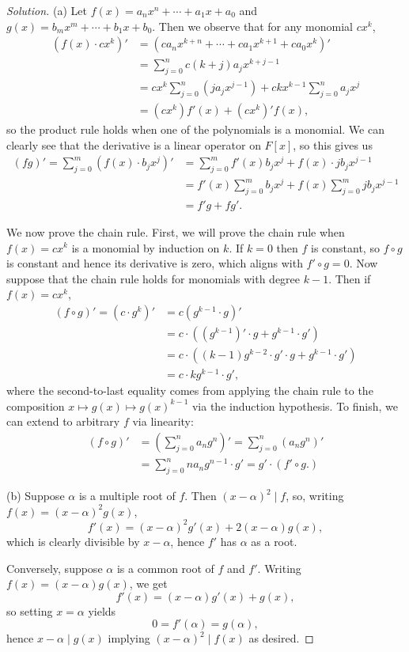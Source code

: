 \documentclass[10pt]{scrartcl}
\newenvironment{soln}{\begin{proof}[Solution]}{\end{proof}}
\begin{document}
\begin{soln}
	(a) Let $f(x) = a_nx^n + \cdots + a_1x+a_0$ and
	$g(x) = b_mx^m + \cdots + b_1x + b_0$.
	Then we observe that for any monomial $cx^k$,
	\begin{align*}
		(f(x)\cdot cx^k)' &=
		(ca_nx^{k+n} + \cdots + ca_1x^{k+1} + ca_0x^k)'\\
		&= \sum_{j=0}^n c(k+j)a_j x^{k+j-1}\\
		&= cx^k\sum_{j=0}^n(ja_j x^{j-1}) +
		ckx^{k-1} \sum_{j=0}^n a_jx^j\\
		&= (cx^k)f'(x) + (cx^k)' f(x),
	\end{align*}
	so the product rule holds when one of the polynomials is a monomial.
	We can clearly see that the derivative is a linear operator on $F[x]$,
	so this gives us
	\begin{align*}
		(fg)' = \sum_{j=0}^m (f(x)\cdot b_jx^j)'
		&= \sum_{j=0}^m f'(x)b_jx^j + f(x)\cdot jb_jx^{j-1}\\
		&= f'(x)\sum_{j=0}^m b_jx^j + f(x)\sum_{j=0}^m jb_jx^{j-1}\\
		&= f'g + fg'.
	\end{align*}

	We now prove the chain rule. First, we will prove the chain rule
	when $f(x) = cx^k$ is a monomial by induction on $k$.
	If $k = 0$ then $f$ is constant, so $f\circ g$ is constant
	and hence its derivative is zero, which aligns with $f'\circ g = 0$.
	Now suppose that the chain rule holds for monomials with degree $k-1$.
	Then if $f(x) = cx^k$,
	\begin{align*}
		(f\circ g)' = (c\cdot g^k)'
		&= c(g^{k-1}\cdot g)'\\
		&= c\cdot ((g^{k-1})'\cdot g + g^{k-1}\cdot g')\\
		&= c\cdot ((k-1)g^{k-2}\cdot g'\cdot g + g^{k-1}\cdot g')\\
		&= c\cdot kg^{k-1}\cdot g',
	\end{align*}
	where the second-to-last equality comes from applying
	the chain rule to the composition $x\mapsto g(x)\mapsto g(x)^{k-1}$
	via the induction hypothesis. To finish, we can extend to arbitrary $f$
	via linearity:
	\begin{align*}
		(f\circ g)' &= \left(\sum_{j=0}^n a_n g^n\right)'
		= \sum_{j=0}^n (a_n g^n)'\\
		&= \sum_{j=0}^n na_n g^{n-1}\cdot g' = g'\cdot (f'\circ g.)
	\end{align*}

	(b) Suppose $\alpha$ is a multiple root of $f$.
	Then $(x-\alpha)^2\mid f$, so, writing $f(x) = (x-\alpha)^2 g(x)$,
	\[f'(x) = (x-\alpha)^2 g'(x) + 2(x-\alpha)g(x),\]
	which is clearly divisible by $x-\alpha$, hence $f'$ has $\alpha$ as a root.
	
	Conversely, suppose $\alpha$ is a common root of $f$ and $f'$.
	Writing $f(x) = (x-\alpha)g(x)$, we get
	\[f'(x) = (x-\alpha)g'(x) + g(x),\]
	so setting $x=\alpha$ yields
	\[0 = f'(\alpha) = g(\alpha),\]
	hence $x-\alpha\mid g(x)$ implying $(x-\alpha)^2\mid f(x)$ as desired.
\end{soln}
\end{document}
